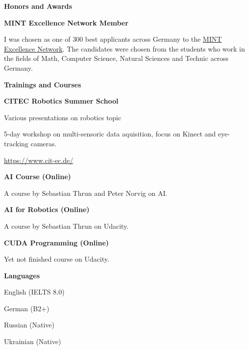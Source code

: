 \documentclass[a4paper,12pt,final]{memoir}
\newcommand{\Sep}{\vspace{1.5em}}
\newcommand{\SmallSep}{\vspace{0.5em}}
\newcommand{\CVSection}[1]
	{\Large\textbf{#1}\par
	\SmallSep\normalsize\normalfont}
\newcommand{\CVItem}[1]
	{\textbf{\color{MidnightBlue} #1}}
\begin{document}
\framebreak
\clearpage
\framebreak
\framebreak

\CVSection{Honors and Awards}
\CVItem{MINT Excellence Network Member}
\begin{compactitem}[\color{MidnightBlue}$\circ$]
	\item I was chosen as one of 300 best applicants across Germany to the \href{http://www.mlp.de/#/studenten/karriere/stipendienprogramme/mint-excellence}{MINT Excellence Network}. The candidates were chosen from the students who work in the fields of Math, Computer Science, Natural Sciences and Technic across Germany.
\end{compactitem}
\Sep


\CVSection{Trainings and Courses}
\CVItem{CITEC Robotics Summer School}
\begin{compactitem}[\color{MidnightBlue}$\circ$]
	\item Various presentations on robotics topic
	\item 5-day workshop on multi-sensoric data aquisition, focus on Kinect and eye-tracking cameras.
	\item \href{https://www.cit-ec.de/}{https://www.cit-ec.de/}
\end{compactitem}
\SmallSep

\CVItem{AI Course (Online)}
\begin{compactitem}[\color{MidnightBlue}$\circ$]
	\item A course by Sebastian Thrun and Peter Norvig on AI.
\end{compactitem}
\SmallSep

\CVItem{AI for Robotics (Online)}
\begin{compactitem}[\color{MidnightBlue}$\circ$]
	\item A course by Sebastian Thrun on Udacity.
\end{compactitem}
\SmallSep

\CVItem{CUDA Programming (Online)}
\begin{compactitem}[\color{MidnightBlue}$\circ$]
	\item Yet not finished course on Udacity.
\end{compactitem}
\SmallSep

\CVSection{Languages}
\begin{compactitem}[\color{MidnightBlue}$\circ$]
	\item English (IELTS 8.0)
	\item German (B2+)
	\item Russian (Native)
	\item Ukrainian (Native)
\end{compactitem}
\SmallSep
\end{document}
